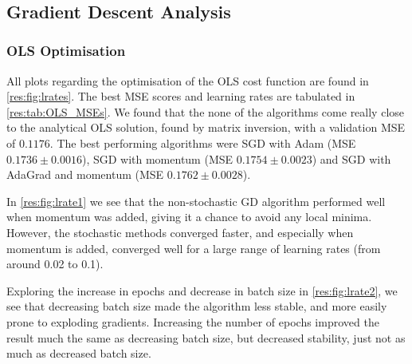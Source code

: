 \\

\subsection{Gradient Descent Analysis}
    
    \subsubsection{OLS Optimisation}
        All plots regarding the optimisation of the OLS cost function are found in \cref{res:fig:lrates}. The best MSE scores and learning rates are tabulated in \cref{res:tab:OLS_MSEs}. We found that the none of the algorithms come really close to the analytical OLS solution, found by matrix inversion, with a validation MSE of $0.1176$. The best performing algorithms were SGD with Adam (MSE $0.1736 \pm 0.0016$), SGD with momentum (MSE $0.1754 \pm 0.0023$) and SGD with AdaGrad and momentum (MSE $0.1762 \pm 0.0028$).

        In \cref{res:fig:lrate1} we see that the non-stochastic GD algorithm performed well when momentum was added, giving it a chance to avoid any local minima. However, the stochastic methods converged faster, and especially when momentum is added, converged well for a large range of learning rates (from around 0.02 to 0.1).

        Exploring the increase in epochs and decrease in batch size in \cref{res:fig:lrate2}, we see that decreasing batch size made the algorithm less stable, and more easily prone to exploding gradients. Increasing the number of epochs improved the result much the same as decreasing batch size, but decreased stability, just not as much as decreased batch size.



